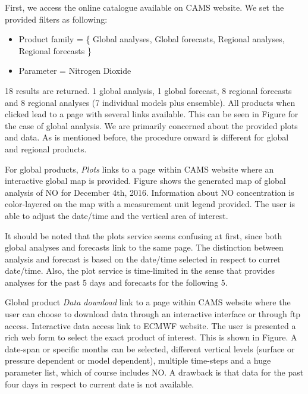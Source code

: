 \documentclass[9pt]{report}
\begin{document}
First, we access the online catalogue available on CAMS website. 
We set the provided filters as following: %

\begin{itemize}%

\item{}
Product family = \{ Global analyses, Global forecasts, Regional analyses, Regional forecasts \} %

\item{}
Parameter = Nitrogen Dioxide %
\end{itemize}%

\noindent{}18 results are returned. 1 global analysis, 1 global forecast, 8 regional forecasts and 8 regional analyses (7 individual models plus ensemble). 
All products when clicked lead to a page with several links available. This can be seen in Figure for the case of global analysis.
We are primarily concerned about the provided plots and data. 
As is mentioned before, the procedure onward is different for global and regional products.%

For global products, \emph{Plots} links to a page within CAMS website where an interactive global map is provided. 
Figure shows the generated map of global analysis of NO for December 4th, 2016.
Information about NO concentration is color-layered on the map with a measurement unit legend provided.
The user is able to adjust the date/time and the vertical area of interest.%

It should be noted that the plots service seems confusing at first, since both global analyses and forecasts link to the same page.
The distinction between analysis and forecast is based on the date/time selected in respect to curret date/time.
Also, the plot service is time-limited in the sense that provides analyses for the past 5 days and forecasts for the following 5.%

Global product \emph{Data download} link to a page within CAMS website where the user can choose to download data through an interactive interface or through ftp access.
Interactive data access link to ECMWF website. The user is presented a rich web form to select the exact product of interest. This is shown in Figure.
A date-span or specific months can be selected, different vertical levels (surface or pressure dependent or model dependent), multiple time-steps and a huge parameter list, which of course includes NO.
A drawback is that data for the past four days in respect to current date is not available.%
\end{document}
